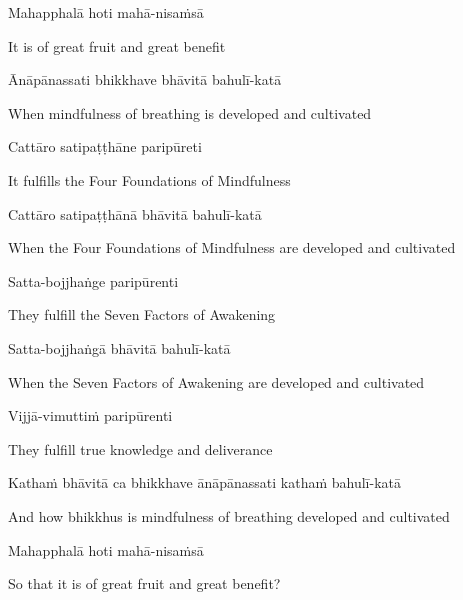 Mahapphalā hoti mahā-nisaṁsā

\begin{cprenglish}
  It is of great fruit and great benefit
\end{cprenglish}

Ānāpānassati bhikkhave bhāvitā bahulī-katā

\begin{cprenglish}
  When mindfulness of breathing is developed and cultivated
\end{cprenglish}

Cattāro satipaṭṭhāne paripūreti

\begin{cprenglish}
  It fulfills the Four Foundations of Mindfulness
\end{cprenglish}

Cattāro satipaṭṭhānā bhāvitā bahulī-katā

\begin{cprenglish}
  When the Four Foundations of Mindfulness are developed and cultivated
\end{cprenglish}

Satta-bojjhaṅge paripūrenti

\begin{cprenglish}
  They fulfill the Seven Factors of Awakening
\end{cprenglish}

Satta-bojjhaṅgā bhāvitā bahulī-katā

\begin{cprenglish}
  When the Seven Factors of Awakening are developed and cultivated
\end{cprenglish}

Vijjā-vimuttiṁ paripūrenti

\begin{cprenglish}
  They fulfill true knowledge and deliverance
\end{cprenglish}

Kathaṁ bhāvitā ca bhikkhave ānāpānassati kathaṁ bahulī-katā

\begin{cprenglish}
  And how bhikkhus is mindfulness of breathing developed and cultivated
\end{cprenglish}

Mahapphalā hoti mahā-nisaṁsā

\begin{cprenglish}
  So that it is of great fruit and great benefit?
\end{cprenglish}


